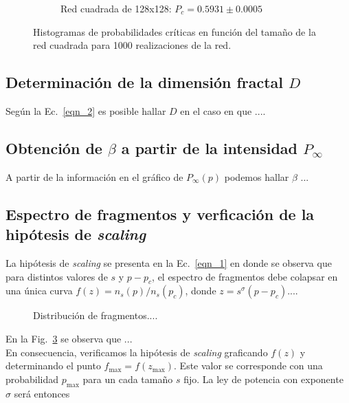 \documentclass[%
 reprint,
 amsmath,amssymb,
 aps,
spanish]{revtex4-1}
\begin{document}
\begin{figure}[h]
\begin{subfigure}{.25\textwidth}
  \caption{Red cuadrada de 128x128: $P_c=0.5931\pm0.0005$}  
  \label{fig:1ahist}
\end{subfigure}
\caption{Histogramas de probabilidades críticas en función del tamaño de la red cuadrada para 1000 realizaciones de la red.}
\label{fig:histograma_red_cuadrada_1a}
\end{figure}

\subsection{\label{D} Determinaci\'on de la dimensi\'on fractal $D$ }

Seg\'un la Ec.~\ref{eqn_2} es posible hallar $D$ en el caso en que ....

\subsection{\label{P} Obtenci\'on de $\beta$ a partir de la intensidad $P_\infty$}

A partir de la informaci\'on en el gr\'afico de $P_\infty(p)$ podemos hallar $\beta$ ...

\subsection{\label{S} Espectro de fragmentos y verficaci\'on de la hip\'otesis de \emph{scaling} }

La hip\'otesis de \emph{scaling} se presenta en la Ec.~\ref{eqn_1} en donde se observa que para distintos valores de $s$ y $p-p_c$, el espectro de fragmentos debe colapsar en una \'unica curva $f(z)=n_s(p)/n_s(p_c)$, donde $z=s^\sigma(p-p_c)$.... 

\begin{figure}[b]
\begin{center}
\caption{Distribuci\'on de fragmentos.... }\label{fig_1}
\end{center}
\end{figure}

En la Fig.~\ref{fig_1} se observa que ... \\


En consecuencia, verificamos la hip\'otesis de \emph{scaling} graficando $f(z)$  y determinando el punto $f_\mathrm{max}=f(z_\mathrm{max})$. Este valor se corresponde con una probabilidad $p_\mathrm{max}$ para un cada tama\~no $s$ fijo. La ley de potencia con exponente $\sigma$ ser\'a entonces
\end{document}
